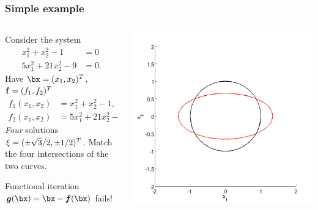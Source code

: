 \documentclass{beamer}
\newcommand{\bfm}[1]{{\boldsymbol{#1}}}
\begin{document}
\begin{frame}
  \frametitle{Simple example}

  \begin{columns}
    \begin{column}{0.5\textwidth}
      Consider the system
      \begin{align*}
        x_1^2 + x_2^2 - 1 & = 0 \\
        5 x_1^2 + 21 x_2^2 - 9 & = 0.
      \end{align*}
      Have $\bx = (x_1, x_2)^T$, ${\bf f} = (f_1,
      f_2)^T$
      \begin{align*}
        f_1(x_1, x_2) & = x_1^2 + x_2^2 - 1, \\
        f_2(x_1, x_2) & = 5 x_1^2 + 21 x_2^2 - 9.
      \end{align*} \pause
      \emph{Four} solutions ${\bf \xi} = (\pm \sqrt{3} /
      2, \pm 1 / 2)^T$. Match the four intersections of the
      two curves. \pause

      \vspace{1ex}

      Functional iteration $\bfm{g}(\bx) = \bx - \bfm{f}(\bx)$ fails!
    \end{column}
    \begin{column}{0.5\textwidth}
      \includegraphics[width=\textwidth]{figures/P1}
    \end{column}
  \end{columns}

\end{frame}
\end{document}
